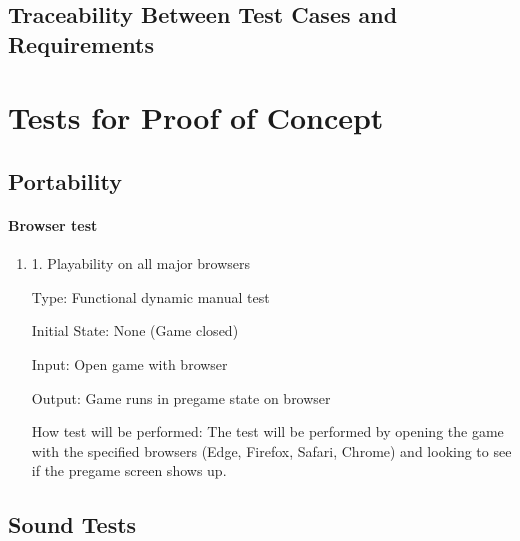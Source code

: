 \documentclass[12pt, titlepage]{article}
\begin{document}
\subsection{Traceability Between Test Cases and Requirements}

\section{Tests for Proof of Concept}

\subsection{Portability}

\paragraph{Browser test}

\begin{enumerate}

\item{1. Playability on all major browsers\\}

Type: Functional dynamic manual test

Initial State: None (Game closed)

Input: Open game with browser

Output: Game runs in pregame state on browser

How test will be performed: The test will be performed by opening the game with the specified browsers (Edge, Firefox, Safari, Chrome) and looking to see if the pregame screen shows up.
\end{enumerate}

\subsection{Sound Tests}
\end{document}
